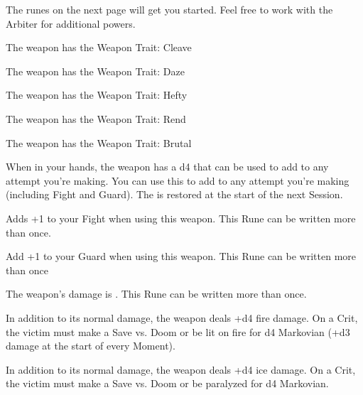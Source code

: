 {{}
 
The runes on the next page will get you started.  Feel free to work with the Arbiter for additional powers.  





The weapon has the Weapon Trait: Cleave


The weapon has the Weapon Trait: Daze


The weapon has the Weapon Trait: Hefty


The weapon has the Weapon Trait: Rend


The weapon has the Weapon Trait: Brutal


When in your hands, the weapon has a d4 \UD that can be used to add to any \RO attempt you're making. You can use this \UD to add to any \RO attempt you're making (including Fight and Guard).  The \UD is restored at the start of the next Session.





Adds +1 to your Fight \RO when using this weapon.  This Rune can be written more than once.



Add +1 to your Guard \RO when using this weapon.  This Rune can be written more than once



The weapon's damage is \DCUP.  This Rune can be written more than once.



In addition to its normal damage, the weapon deals +d4 fire damage.  On a Crit, the victim must make a Save vs. Doom or be lit on fire for d4 Markovian (+d3 damage at the start of every Moment).



In addition to its normal damage, the weapon deals +d4 ice damage.  On a Crit, the victim must make a Save vs. Doom or be paralyzed for d4 Markovian.



}
